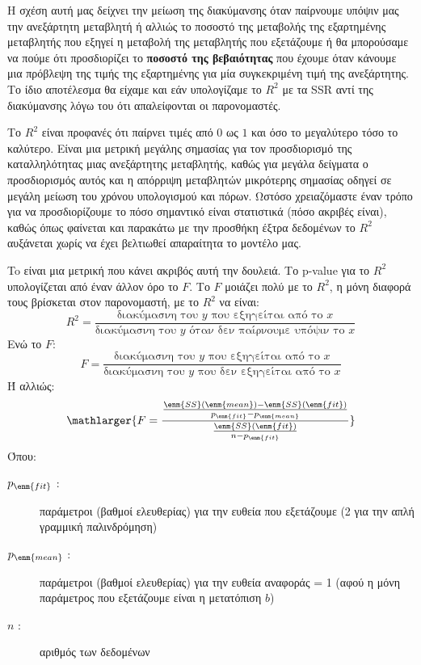 Η σχέση αυτή μας δείχνει την μείωση της διακύμανσης όταν παίρνουμε υπόψιν μας την
ανεξάρτητη μεταβλητή ή αλλιώς το ποσοστό της μεταβολής της εξαρτημένης μεταβλητής που
εξηγεί η μεταβολή της μεταβλητής που εξετάζουμε ή θα μπορούσαμε να πούμε ότι
προσδιορίζει το \textbf{ποσοστό της βεβαιότητας} που έχουμε όταν κάνουμε μια πρόβλεψη της τιμής
της εξαρτημένης για μία συγκεκριμένη τιμή της ανεξάρτητης. Το ίδιο αποτέλεσμα θα είχαμε
και εάν υπολογίζαμε το $R^2$ με τα \textlatin{SSR} αντί της διακύμανσης λόγω του ότι απαλείφονται οι
παρονομαστές.

Το $R^2$
είναι προφανές ότι παίρνει τιμές από $0$ ως $1$ και όσο το μεγαλύτερο
τόσο το καλύτερο. Είναι μια μετρική μεγάλης σημασίας για τον προσδιορισμό της
καταλληλότητας μιας ανεξάρτητης μεταβλητής, καθώς για μεγάλα δείγματα ο
προσδιορισμός αυτός και η απόρριψη μεταβλητών μικρότερης σημασίας οδηγεί σε μεγάλη
μείωση του χρόνου υπολογισμού και πόρων. Ωστόσο χρειαζόμαστε έναν τρόπο για να
προσδιορίζουμε το πόσο σημαντικό είναι στατιστικά (πόσο ακριβές είναι), καθώς όπως
φαίνεται και παρακάτω με την προσθήκη έξτρα δεδομένων το $R^2$ αυξάνεται χωρίς να έχει
βελτιωθεί απαραίτητα το μοντέλο μας.

To  είναι μια μετρική που κάνει ακριβός αυτή την δουλειά. Το \textlatin{p-value} για το $R^2$
υπολογίζεται από έναν άλλον όρο το $F$. Το $F$ μοιάζει πολύ με το $R^2$, η μόνη διαφορά τους
βρίσκεται στον παρονομαστή, με το $R^2$
να είναι:
$$R^2=\frac{\text{διακύμασνη του }y\text{ που εξηγείται από το }x}{\text{διακύμασνη του }y\text{ όταν δεν παίρνουμε υπόψιν το }x}$$
Ενώ το $F$:
$$F=\frac{\text{διακύμασνη του }y\text{ που εξηγείται από το }x}{\text{διακύμασνη του }y\text{ που δεν εξηγείται από το }x}$$
Ή αλλιώς:
$$\mathlarger{F =\frac{\frac{\enm{SS}(\enm{mean}) - \enm{SS}(\enm{fit})}{p_{\enm{fit}} - p_{\enm{mean}}}} {\frac{\enm{SS}(\enm{fit})}{n - p_{\enm{fit}}}}}$$
Όπου:
\begin{description}
    \item[$p_{\enm{fit}}$ :] παράμετροι (βαθμοί ελευθερίας) για την ευθεία που εξετάζουμε (2 για την απλή γραμμική παλινδρόμηση)
    \item[$p_{\enm{mean}}$ :]  παράμετροι (βαθμοί ελευθερίας) για την ευθεία αναφοράς = 1 (αφού η μόνη παράμετρος που εξετάζουμε είναι η μετατόπιση $b$)
    \item[$n$ :] αριθμός των δεδομένων
\end{description}

